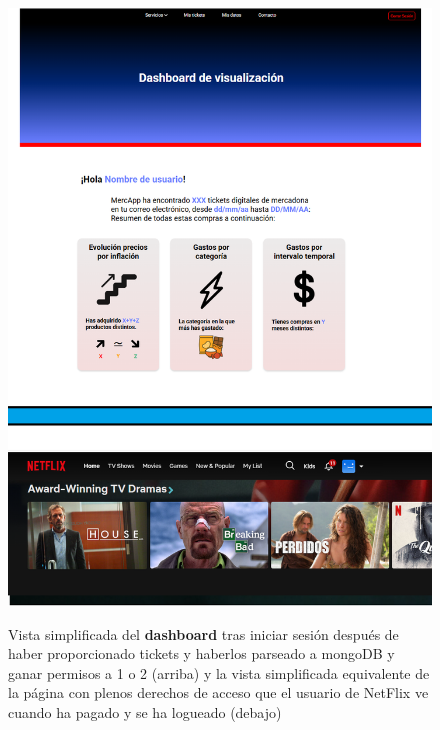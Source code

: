 \documentclass[a4paper,12pt]{report}
\begin{document}
	\FloatBarrier
	\setlength{\belowcaptionskip}{3pt}
	\begin{figure}[H]
		\centering
		\caption{Vista simplificada del \textbf{dashboard} tras iniciar sesión después de haber proporcionado tickets y haberlos parseado a mongoDB y ganar permisos a 1 o 2 (arriba) y la vista simplificada equivalente de la página con plenos derechos de acceso que el usuario de NetFlix ve cuando ha pagado y se ha logueado (debajo)}
		\includegraphics[width=1\linewidth]{img/dashboard}
		\label{fig:dashboard}
	\end{figure}
	\FloatBarrier
	
\end{document}

